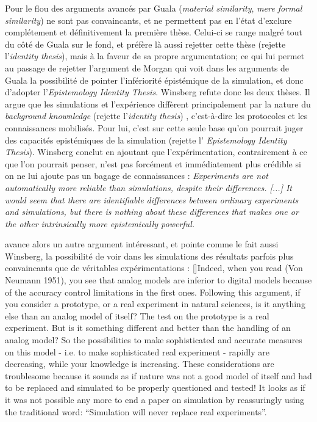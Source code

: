 Pour \textcite{Winsberg2009} le flou des arguments avancés par Guala  (\textit{material similarity}, \textit{mere formal similarity}) ne sont pas convaincants, et ne permettent pas en l'état d'exclure complétement et définitivement la première thèse. Celui-ci se range malgré tout du côté de Guala sur le fond, et préfère là aussi rejetter cette thèse (rejette l'\textit{identity thesis}), mais à la faveur de sa propre argumentation; ce qui lui permet au passage de rejetter l'argument de Morgan qui voit dans les arguments de Guala la possibilité de pointer l'infériorité épistémique de la simulation, et donc d'adopter l'\textit{Epistemology Identity Thesis}. Winsberg refute donc les deux thèses. Il argue que les simulations et l'expérience diffèrent principalement par la nature du \textit{background knownledge} (rejette l'\textit{identity thesis}) , c'est-à-dire les protocoles et les connaissances mobilisés. Pour lui, c'est sur cette seule base qu'on pourrait juger des capacités epistémiques de la simulation (rejette l' \textit{Epistemology Identity Thesis}). Winsberg conclut en ajoutant que l'expérimentation, contrairement à ce que l'on pourrait penser, n'est pas forcément et immédiatement plus crédible si on ne lui ajoute pas un bagage de connaissances : \textit{Experiments are not automatically more reliable than simulations, despite their differences. [...] It would seem that there are identifiable differences between ordinary experiments and simulations, but there is nothing about these differences that makes one or the other intrinsically more epistemically powerful.}  \autocites{Winsberg2009, Winsberg2013}

\textcite{Varenne2001} avance alors un autre argument intéressant, et pointe comme le fait aussi Winsberg, la possibilité de voir dans les simulations des résultats parfois plus convaincants que de véritables expérimentations : [\cite{Varenne2001}]{Indeed, when you read (Von Neumann 1951), you see that analog models are inferior to digital models because of the accuracy control limitations in the first ones. Following this argument, if you consider a prototype, or a real experiment in natural sciences, is it anything else than an analog model of itself? The test on the prototype is a real experiment. But is it something different and better than the handling of an analog model? So the possibilities to make sophisticated and accurate measures on this model - i.e. to make sophisticated real experiment - rapidly are decreasing, while your knowledge is increasing. These considerations are troublesome because it sounds as if nature was not a good model of itself and had to be replaced and simulated to be properly questioned and tested! It looks as if it was not possible any more to end a paper on simulation by reassuringly using the traditional word: \enquote{Simulation will never replace real experiments}. }

